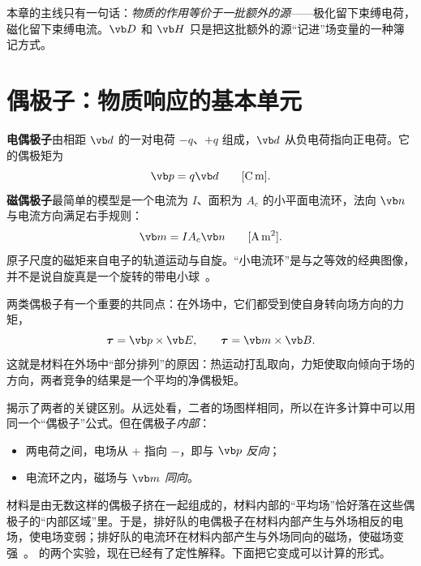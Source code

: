 \begin{intuition}
本章的主线只有一句话：\emph{物质的作用等价于一批额外的源}——极化留下束缚电荷，磁化留下束缚电流。$\vb D$ 和 $\vb H$ 只是把这批额外的源“记进”场变量的一种簿记方式。
\end{intuition}

\section{偶极子：物质响应的基本单元}\label{sec:matter-dipoles}

\textbf{电偶极子}由相距 $\vb d$ 的一对电荷 $-q$、$+q$ 组成，$\vb d$ 从负电荷指向正电荷。它的偶极矩为
\begin{equation}
\vb p=q\vb d\qquad[\mathrm{C\,m}].
\label{eq:pdipole}
\end{equation}
\textbf{磁偶极子}最简单的模型是一个电流为 $I$、面积为 $A_c$ 的小平面电流环，法向 $\vb n$ 与电流方向满足右手规则：
\begin{equation}
\vb m=IA_c\vb n\qquad[\mathrm{A\,m^2}].
\label{eq:mdipole}
\end{equation}
原子尺度的磁矩来自电子的轨道运动与自旋。“小电流环”是与之等效的经典图像，并不是说自旋真是一个旋转的带电小球~\cite{magnetization}。

两类偶极子有一个重要的共同点：在外场中，它们都受到使自身转向场方向的力矩，
\begin{equation}
\boldsymbol\tau=\vb p\times\vb E,\qquad \boldsymbol\tau=\vb m\times\vb B .
\label{eq:dipoletorque}
\end{equation}
这就是材料在外场中“部分排列”的原因：热运动打乱取向，力矩使取向倾向于场的方向，两者竞争的结果是一个平均的净偶极矩。


 揭示了两者的关键区别。从远处看，二者的场图样相同，所以在许多计算中可以用同一个“偶极子”公式。但在偶极子\emph{内部}：
\begin{itemize}
\item 两电荷之间，电场从 $+$ 指向 $-$，即与 $\vb p$ \emph{反向}；
\item 电流环之内，磁场与 $\vb m$ \emph{同向}。
\end{itemize}
材料是由无数这样的偶极子挤在一起组成的，材料内部的“平均场”恰好落在这些偶极子的“内部区域”里。于是，排好队的电偶极子在材料内部产生与外场相反的电场，使电场变弱；排好队的电流环在材料内部产生与外场同向的磁场，使磁场变强~\cite{purcell}。 的两个实验，现在已经有了定性解释。下面把它变成可以计算的形式。

